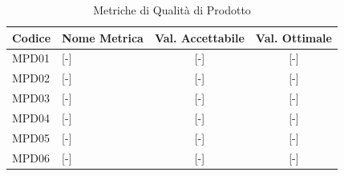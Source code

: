 \begin{table}[H]
	\centering
	\renewcommand{\arraystretch}{1.3}
	\begin{tabularx}{\textwidth}{|l|X|c|c|}
		\hline
		\rowcolor{primarycolor!10}
		\textbf{Codice} & \textbf{Nome Metrica} & \textbf{Val. Accettabile} & \textbf{Val. Ottimale} \\
		\hline
		MPD01 & [-] & [-] & [-] \\
		\hline
		MPD02 & [-] & [-] & [-] \\
		\hline
		MPD03 & [-] & [-] & [-] \\
		\hline
		MPD04 & [-] & [-] & [-] \\
		\hline
		MPD05 & [-] & [-] & [-] \\
		\hline
		MPD06 & [-] & [-] & [-] \\
		\hline
	\end{tabularx}
	\caption{Metriche di Qualità di Prodotto}
\end{table}